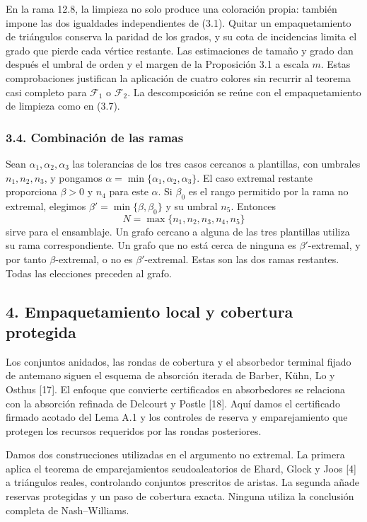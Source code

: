 \documentclass[spanish,11pt,a4paper]{article}
\begin{document}
En la rama 12.8, la limpieza no solo produce una coloración propia: también impone las dos igualdades independientes de (3.1). Quitar un empaquetamiento de triángulos conserva la paridad de los grados, y su cota de incidencias limita el grado que pierde cada vértice restante. Las estimaciones de tamaño y grado dan después el umbral de orden y el margen de la Proposición 3.1 a escala \(m\). Estas comprobaciones justifican la aplicación de cuatro colores sin recurrir al teorema casi completo para \(\mathcal F_1\) o \(\mathcal F_2\). La descomposición se reúne con el empaquetamiento de limpieza como en (3.7).

\subsubsection{3.4. Combinación de las ramas}\label{combinaciuxf3n-de-las-ramas}

Sean \(\alpha_1,\alpha_2,\alpha_3\) las tolerancias de los tres casos cercanos a plantillas, con umbrales \(n_1,n_2,n_3\), y pongamos \(\alpha=\min\{\alpha_1,\alpha_2,\alpha_3\}\). El caso extremal restante proporciona \(\beta>0\) y \(n_4\) para este \(\alpha\). Si \(\beta_0\) es el rango permitido por la rama no extremal, elegimos \(\beta'=\min\{\beta,\beta_0\}\) y su umbral \(n_5\). Entonces \[N=\max\{n_1,n_2,n_3,n_4,n_5\}
\tag{3.8}\] sirve para el ensamblaje. Un grafo cercano a alguna de las tres plantillas utiliza su rama correspondiente. Un grafo que no está cerca de ninguna es \(\beta'\)-extremal, y por tanto \(\beta\)-extremal, o no es \(\beta'\)-extremal. Estas son las dos ramas restantes. Todas las elecciones preceden al grafo.


\subsection{4. Empaquetamiento local y cobertura protegida}\label{empaquetamiento-local-y-cobertura-protegida}

Los conjuntos anidados, las rondas de cobertura y el absorbedor terminal fijado de antemano siguen el esquema de absorción iterada de Barber, Kühn, Lo y Osthus {[}17{]}. El enfoque que convierte certificados en absorbedores se relaciona con la absorción refinada de Delcourt y Postle {[}18{]}. Aquí damos el certificado firmado acotado del Lema A.1 y los controles de reserva y emparejamiento que protegen los recursos requeridos por las rondas posteriores.

Damos dos construcciones utilizadas en el argumento no extremal. La primera aplica el teorema de emparejamientos seudoaleatorios de Ehard, Glock y Joos {[}4{]} a triángulos reales, controlando conjuntos prescritos de aristas. La segunda añade reservas protegidas y un paso de cobertura exacta. Ninguna utiliza la conclusión completa de Nash--Williams.
\end{document}
